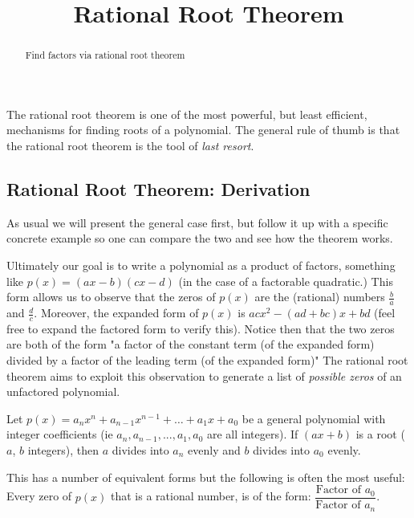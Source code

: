 \documentclass{ximera}
\title{Rational Root Theorem}
\begin{document}
\begin{abstract}
Find factors via rational root theorem
\end{abstract}
\maketitle

The rational root theorem is one of the most powerful, but least efficient, mechanisms for finding roots of a polynomial. The general rule of thumb is that the rational root theorem is the tool of \textit{last resort}.


\subsection*{Rational Root Theorem: Derivation}
    
    As usual we will present the general case first, but follow it up with a specific concrete example so one can compare the two and see how the theorem works.
    
    Ultimately our goal is to write a polynomial as a product of factors, something like $p(x) = (ax - b)(cx - d)$ (in the case of a factorable quadratic.) This form allows us to observe that the zeros of $p(x)$ are the (rational) numbers $\frac{b}{a}$ and $\frac{d}{c}$. Moreover, the expanded form of $p(x)$ is $acx^2 - (ad + bc)x + bd$ (feel free to expand the factored form to verify this). Notice then that the two zeros are both of the form "a factor of the constant term (of the expanded form) divided by a factor of the leading term (of the expanded form)"  The rational root theorem aims to exploit this observation to generate a list of \textit{possible zeros} of an unfactored polynomial.
    
    \begin{theorem}
        Let $p(x) = a_nx^n + a_{n-1}x^{n-1} + \dots + a_1x + a_0$ be a general polynomial with integer coefficients (ie $a_n, a_{n-1}, ..., a_1, a_0$ are all integers). If $(ax + b)$ is a root ($a$, $b$ integers), then  $a$ divides into $a_n$ evenly and $b$ divides into $a_0$ evenly.
        
        This has a number of equivalent forms but the following is often the most useful:
        Every zero of $p(x)$ that is a rational number, is of the form: $\dfrac{\text{Factor of }a_0}{\text{Factor of }a_n}$.
    \end{theorem}
    
\end{document}
